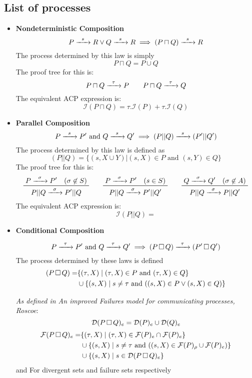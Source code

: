 \documentclass{article}
\begin{document}
\newpage
\subsection{List of processes}

\begin{itemize}
    \item \textbf{Nondeterministic Composition}
    \[P \prightarrow{s} R \vee Q \prightarrow{s} R \implies (P \sqcap Q) \prightarrow{s} R\]
    The process determined by this law is simply
    \[P \sqcap Q = P \cup Q\]
    The proof tree for this is:
    \[P \sqcap Q \prightarrow{\tau} P \qquad P \sqcap Q \prightarrow{\tau} Q\]
    The equivalent ACP expression is:
    \[\mathscr{I}(P \sqcap Q) = \tau. \mathscr{I}(P) + \tau. \mathscr{I}(Q)\]

    \item \textbf{Parallel Composition}
    \[P \prightarrow{s} P' \text{ and } Q \prightarrow{s} Q' \implies (P | | Q) \prightarrow{s} (P' | | Q')\]
    The process determined by this law is defined as
    \[(P | | Q) = \{(s, X \cup Y) | (s, X) \in P \text{ and } (s, Y)\in Q\}\]
    The proof tree for this is:
    \[\prftree{P \prightarrow{\sigma} P' \quad (\sigma\not\in S)}{P | | Q \prightarrow{\sigma} P' | | Q} \qquad \prftree{P \prightarrow{\sigma} P' \quad (s\in S)}{P | | Q \prightarrow{\sigma} P' | | Q'} \qquad \prftree{Q \prightarrow{\sigma} Q' \quad (\sigma\not\in A)}{P | | Q \prightarrow{\sigma} P | | Q'}\]
    The equivalent ACP expression is:
    \[\mathscr{I}(P | | Q) = \]

    \item \textbf{Conditional Composition}

    \[P \prightarrow{\tau} P' \text{ and } Q \prightarrow{\tau} Q' \implies (P \detcomp Q) \prightarrow{\tau} (P' \detcomp Q')\]
    The process determined by these laws is defined
    \begin{align*}
        (P \,\square\, Q) = &\{(\tau, X) \mid (\tau, X) \in P \text{ and } (\tau, X) \in Q\}\\
                         & \cup \{(s, X) \mid s \ne \tau \text{ and } ((s, X)\in P \vee (s, X)\in Q)\}
    \end{align*}

    \textit{As defined in An improved Failures model for communicating processes, Roscoe}:
    \[\mathcal{D}(P \,\square\, Q)_{e} = \mathcal{D}(P)_{e} \cup \mathcal{D}(Q)_{e}\]
    \begin{align*}
        \mathcal{F}(P \,\square\, Q)_{e} = &\{(\tau, X) \mid (\tau, X) \in \mathcal{F}(P)_{e} \cap \mathcal{F}(P)_{e}\}\\
                         & \cup \{(s, X) \mid s \ne \tau \text{ and } ((s, X)\in \mathcal{F}(P)_{\rho} \cup \mathcal{F}(P)_{e})\}\\
                         &\cup \{(s, X) \mid s\in \mathcal{D}(P \,\square\, Q)_{e}\}
    \end{align*}
    and
    For divergent sets and failure sets respectively


\end{itemize}
\end{document}
